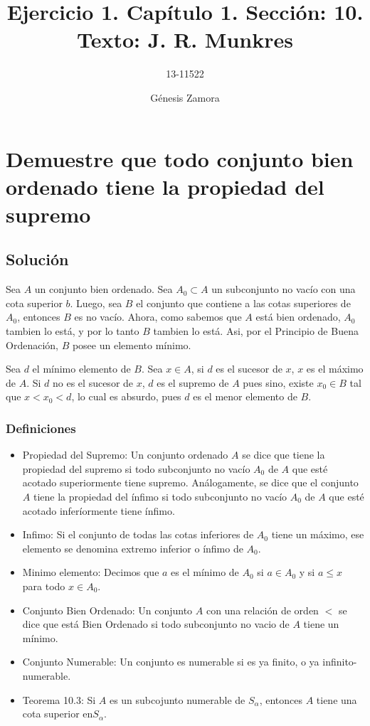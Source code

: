 \documentclass[12pt ,spanish]{article}
\title{Ejercicio 1. Capítulo 1. Sección: 10. Texto: J. R. Munkres}
\author{13-11522}
\date{Génesis Zamora}
\begin{document}
\maketitle

\section{Demuestre que todo conjunto bien ordenado tiene la propiedad del supremo}

\subsection{Solución}

Sea $A$ un conjunto bien ordenado. Sea $A_{0}\subset{A}$ un subconjunto no vacío con una cota superior $b$.
Luego, sea $B$ el conjunto que contiene a las cotas superiores de $A_0$, entonces $B$ es no vacío. Ahora, como sabemos que $A$ está bien ordenado, $A_0$ tambien lo está, y por lo tanto $B$ tambien lo está. Asi, por el Principio de Buena Ordenación, $B$ posee un elemento mínimo.

\medskip

Sea $d$ el mínimo elemento de $B$.
Sea $x\in{A}$, si $d$ es el sucesor de $x$, $x$ es el máximo de $A$.
Si $d$ no es el sucesor de $x$, $d$ es el supremo de $A$ pues sino, existe $x_{0}\in{B}$ tal que $x<x_{0}<d$, lo cual es absurdo, pues $d$ es el menor elemento de $B$.

\subsubsection{Definiciones}

\begin{itemize}
    \item Propiedad del Supremo: Un conjunto ordenado  $A$ se dice que tiene la propiedad del supremo si todo subconjunto no vacío $A_{0}$ de $A$ que esté acotado superiormente tiene supremo. Análogamente, se dice que el conjunto $A$ tiene la propiedad del ínfimo si todo subconjunto no vacío $A_{0}$ de $A$ que esté acotado inferíormente tiene ínfimo.
    \item Infimo: Si el conjunto de todas las cotas inferiores de $A_{0}$ tiene un máximo, ese elemento se denomina extremo inferior o ínfimo de $A_{0}$.
    \item Minimo elemento:  Decimos que $a$ es el mínimo de $A_{0}$ si $a\in{A_{0}}$ y si $a\leq{x}$ para todo $x\in{A_{0}}$.
    \item Conjunto Bien Ordenado: Un conjunto $A$ con una relación de orden $<$ se dice que está Bien Ordenado si todo subconjunto no vacio de $A$ tiene un mínimo.
    \item Conjunto Numerable: Un conjunto es numerable si es ya finito, o ya infinito-numerable.
    \item Teorema 10.3: Si $A$ es un subcojunto numerable de $S_{\alpha }$, entonces $A$ tiene una cota superior en$S_{\alpha }$.
\end{itemize}
\end{document}
